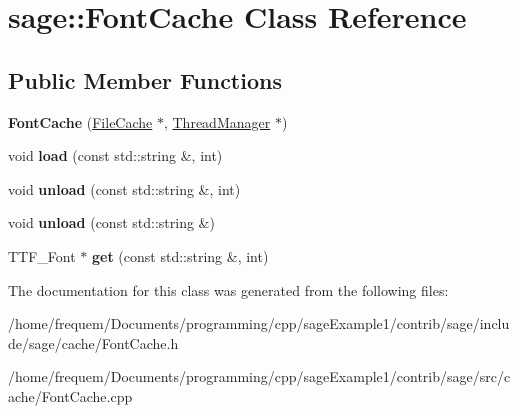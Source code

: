 \hypertarget{classsage_1_1FontCache}{}\section{sage\+::Font\+Cache Class Reference}
\label{classsage_1_1FontCache}
\subsection*{Public Member Functions}
\begin{DoxyCompactItemize}
\item 
\mbox{\label{classsage_1_1FontCache_ae8c3c01ce64871f70b4bab669015784e}} 
{\bfseries Font\+Cache} (\mbox{\hyperlink{classsage_1_1FileCache}{File\+Cache}} $\ast$, \mbox{\hyperlink{classsage_1_1ThreadManager}{Thread\+Manager}} $\ast$)
\item 
\mbox{\label{classsage_1_1FontCache_a2221e34a4ddd51266f374b727baac79e}} 
void {\bfseries load} (const std\+::string \&, int)
\item 
\mbox{\label{classsage_1_1FontCache_a0d4b71fedf081cb72eab09dc53ea251f}} 
void {\bfseries unload} (const std\+::string \&, int)
\item 
\mbox{\label{classsage_1_1FontCache_a7c166cbed37cfeee2ea02e698e6c58d0}} 
void {\bfseries unload} (const std\+::string \&)
\item 
\mbox{\label{classsage_1_1FontCache_a36e3d099603a50bc73a4d8ff6d6bc8dc}} 
T\+T\+F\+\_\+\+Font $\ast$ {\bfseries get} (const std\+::string \&, int)
\end{DoxyCompactItemize}


The documentation for this class was generated from the following files\+:\begin{DoxyCompactItemize}
\item 
/home/frequem/\+Documents/programming/cpp/sage\+Example1/contrib/sage/include/sage/cache/Font\+Cache.\+h\item 
/home/frequem/\+Documents/programming/cpp/sage\+Example1/contrib/sage/src/cache/Font\+Cache.\+cpp\end{DoxyCompactItemize}
